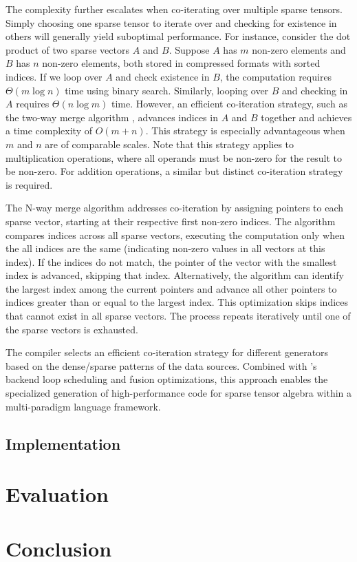 \documentclass[acmsmall,nonacm]{acmart}\settopmatter{printfolios=true,printccs=false,printacmref=false}
\newcommand{\rhyme}{\text{Rhyme}\xspace}
\begin{document}
The complexity further escalates when co-iterating over multiple sparse tensors. Simply choosing one sparse tensor to iterate over and checking for existence in others will generally yield suboptimal performance. For instance, consider the dot product of two sparse vectors $A$ and $B$. Suppose $A$ has $m$ non-zero elements and $B$ has $n$ non-zero elements, both stored in compressed formats with sorted indices. If we loop over $A$ and check existence in $B$, the computation requires $\Theta(m\log{}n)$ time using binary search. Similarly, looping over $B$ and checking in $A$ requires $\Theta(n\log{}m)$ time. However, an efficient co-iteration strategy, such as the two-way merge algorithm \cite{knuth}, advances indices in $A$ and $B$ together and achieves a time complexity of $O(m + n)$. This strategy is especially advantageous when $m$ and $n$ are of comparable scales. Note that this strategy applies to multiplication operations, where all operands must be non-zero for the result to be non-zero. For addition operations, a similar but distinct co-iteration strategy is required.\par
The N-way merge algorithm addresses co-iteration by assigning pointers to each sparse vector, starting at their respective first non-zero indices. The algorithm compares indices across all sparse vectors, executing the computation only when the all indices are the same (indicating non-zero values in all vectors at this index). If the indices do not match, the pointer of the vector with the smallest index is advanced, skipping that index. Alternatively, the algorithm can identify the largest index among the current pointers and advance all other pointers to indices greater than or equal to the largest index. This optimization skips indices that cannot exist in all sparse vectors. The process repeats iteratively until one of the sparse vectors is exhausted.\par
The \rhyme compiler selects an efficient co-iteration strategy for different generators based on the dense/sparse patterns of the data sources. Combined with \rhyme's backend loop scheduling and fusion optimizations, this approach enables the specialized generation of high-performance code for sparse tensor algebra within a multi-paradigm language framework.
\subsection*{Implementation}
\section{Evaluation}\label{evaluation}
\section{Conclusion}\label{conclusion}


\end{document}
